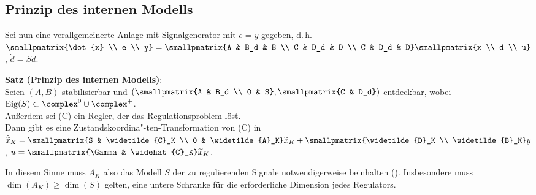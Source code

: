 \pagebreak

\subsection{%
    Prinzip des internen Modells%
}

Sei nun eine verallgemeinerte Anlage mit Signalgenerator mit $e = y$ gegeben, d.\,h.\\
$\smallpmatrix{\dot{x} \\ e \\ y} = \smallpmatrix{A & B_d & B \\ C & D_d & D \\ C & D_d & D}
\smallpmatrix{x \\ d \\ u}$, $\dot{d} = Sd$.

\textbf{Satz (Prinzip des internen Modells)}:\\
Seien $(A, B)$ stabilisierbar und
$\left(\smallpmatrix{A & B_d \\ 0 & S}, \smallpmatrix{C & D_d}\right)$ entdeckbar,
wobei $\Eig(S) \subset \complex^0 \cup \complex^+$.\\
Außerdem sei (C) ein Regler, der das Regulationsproblem löst.\\
Dann gibt es eine Zustandskoordina"-ten-Transformation von (C) in\\
$\dot{\widetilde{x}}_K = \smallpmatrix{S & \widetilde{C}_K \\ 0 & \widetilde{A}_K} \widetilde{x}_K
+ \smallpmatrix{\widetilde{D}_K \\ \widetilde{B}_K} y$,
$u = \smallpmatrix{\Gamma & \widehat{C}_K} \widetilde{x}_K$.

In diesem Sinne muss $A_K$ also das Modell $S$ der zu regulierenden Signale
notwendigerweise beinhalten
().
Insbesondere muss $\dim(A_K) \ge \dim(S)$ gelten, eine untere Schranke für die erforderliche
Dimension jedes Regulators.

\linie

